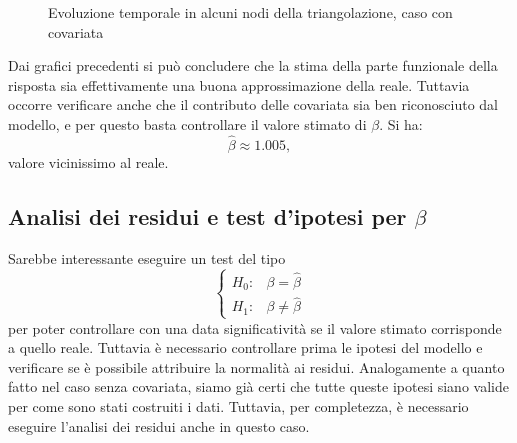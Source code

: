 \documentclass[a4paper,11pt,twoside,openright]{book}							%
\begin{document}
\begin{figure}[t]
	\centering
	\caption{Evoluzione temporale in alcuni nodi della triangolazione, caso con covariata}
	\label{fig:DomCcovar_ris2}
\end{figure}

Dai grafici precedenti si può concludere che la stima della parte funzionale della risposta sia effettivamente una buona approssimazione della reale. Tuttavia occorre verificare anche che il contributo delle covariata sia ben riconosciuto dal modello, e per questo basta controllare il valore stimato di $\beta$. Si ha:
$$
\hat{\beta} \approx 1.005,
$$
valore vicinissimo al reale.

\subsection{Analisi dei residui e test d'ipotesi per $\beta$}
Sarebbe interessante eseguire un test del tipo
$$
\begin{cases}
H_0: & \beta=\hat{\beta} \\
H_1: & \beta \not = \hat{\beta}
\end{cases}
$$
per poter controllare con una data significatività se il valore stimato corrisponde a quello reale. Tuttavia è necessario controllare prima le ipotesi del modello e verificare se è possibile attribuire la normalità ai residui. Analogamente a quanto fatto nel caso senza covariata, siamo già certi che tutte queste ipotesi siano valide per come sono stati costruiti i dati. Tuttavia, per completezza, è necessario eseguire l'analisi dei residui anche in questo caso.
\end{document}
